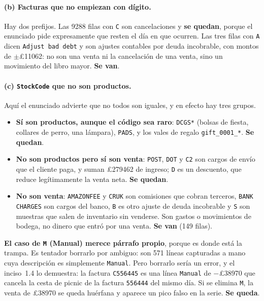 \documentclass[11pt]{article}
\newcommand{\gbp}{\pounds}
\begin{document}
\paragraph{(b) Facturas que no empiezan con d\'igito.} Hay dos prefijos.
Las \num{9288} filas con \texttt{C} son cancelaciones y \textbf{se quedan},
porque el enunciado pide expresamente que resten el d\'ia en que ocurren.
Las tres filas con \texttt{A} dicen \texttt{Adjust bad debt} y son ajustes
contables por deuda incobrable, con montos de $\pm$\gbp\num{11062}: no son
una venta ni la cancelaci\'on de una venta, sino un movimiento del libro
mayor. \textbf{Se van}.

\paragraph{(c) \texttt{StockCode} que no son productos.} Aqu\'i el
enunciado advierte que no todos son iguales, y en efecto hay tres grupos.
\begin{itemize}[nosep,leftmargin=1.4em]
  \item \textbf{S\'i son productos, aunque el c\'odigo sea raro}:
  \texttt{DCGS*} (bolsas de fiesta, collares de perro, una l\'ampara),
  \texttt{PADS}, y los vales de regalo \texttt{gift\_0001\_*}. \textbf{Se
  quedan}.
  \item \textbf{No son productos pero s\'i son venta}: \texttt{POST},
  \texttt{DOT} y \texttt{C2} son cargos de env\'io que el cliente paga, y
  suman \gbp\num{279462} de ingreso; \texttt{D} es un descuento, que reduce
  leg\'itimamente la venta neta. \textbf{Se quedan}.
  \item \textbf{No son venta}: \texttt{AMAZONFEE} y \texttt{CRUK} son
  comisiones que cobran terceros, \texttt{BANK CHARGES} son cargos del banco,
  \texttt{B} es otro ajuste de deuda incobrable y \texttt{S} son muestras que
  salen de inventario sin venderse. Son gastos o movimientos de bodega, no
  dinero que entr\'o por una venta. \textbf{Se van} (\num{149} filas).
\end{itemize}

\textbf{El caso de \texttt{M} (Manual) merece p\'arrafo propio}, porque es
donde est\'a la trampa. Es tentador borrarlo por ambiguo: son
\num{571} l\'ineas capturadas a mano cuya descripci\'on es simplemente
\texttt{Manual}. Pero borrarlo ser\'ia un error, y el inciso~1.4 lo
demuestra: la factura \texttt{C556445} es una l\'inea \texttt{Manual} de
$-$\gbp\num{38970} que cancela la cesta de picnic de la factura
\texttt{556444} del mismo d\'ia. Si se elimina \texttt{M}, la venta de
\gbp\num{38970} se queda hu\'erfana y aparece un pico falso en la serie.
\textbf{Se queda}.
\end{document}

